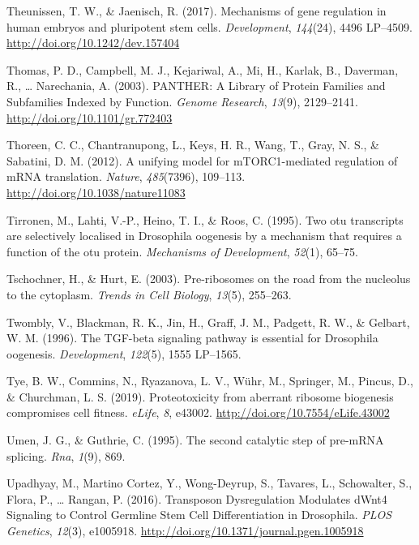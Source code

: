 \documentclass[12pt,oneside]{reedthesis}
\newlength{\cslhangindent}
\newenvironment{cslreferences}%
  {\setlength{\parindent}{0pt}%
  \everypar{\setlength{\hangindent}{\cslhangindent}}\ignorespaces}%
  {\par}
\begin{document}
\begin{cslreferences}
\leavevmode\hypertarget{ref-Theunissen2017b}{}%
Theunissen, T. W., \& Jaenisch, R. (2017). Mechanisms of gene regulation in human embryos and pluripotent stem cells. \emph{Development}, \emph{144}(24), 4496 LP--4509. \url{http://doi.org/10.1242/dev.157404}

\leavevmode\hypertarget{ref-thomasPANTHERLibraryProtein2003}{}%
Thomas, P. D., Campbell, M. J., Kejariwal, A., Mi, H., Karlak, B., Daverman, R., \ldots{} Narechania, A. (2003). PANTHER: A Library of Protein Families and Subfamilies Indexed by Function. \emph{Genome Research}, \emph{13}(9), 2129--2141. \url{http://doi.org/10.1101/gr.772403}

\leavevmode\hypertarget{ref-thoreenUnifyingModelMTORC1mediated2012}{}%
Thoreen, C. C., Chantranupong, L., Keys, H. R., Wang, T., Gray, N. S., \& Sabatini, D. M. (2012). A unifying model for mTORC1-mediated regulation of mRNA translation. \emph{Nature}, \emph{485}(7396), 109--113. \url{http://doi.org/10.1038/nature11083}

\leavevmode\hypertarget{ref-Tirronen1995}{}%
Tirronen, M., Lahti, V.-P., Heino, T. I., \& Roos, C. (1995). Two otu transcripts are selectively localised in Drosophila oogenesis by a mechanism that requires a function of the otu protein. \emph{Mechanisms of Development}, \emph{52}(1), 65--75.

\leavevmode\hypertarget{ref-Tschochner2003a}{}%
Tschochner, H., \& Hurt, E. (2003). Pre-ribosomes on the road from the nucleolus to the cytoplasm. \emph{Trends in Cell Biology}, \emph{13}(5), 255--263.

\leavevmode\hypertarget{ref-Twombly1996d}{}%
Twombly, V., Blackman, R. K., Jin, H., Graff, J. M., Padgett, R. W., \& Gelbart, W. M. (1996). The TGF-beta signaling pathway is essential for Drosophila oogenesis. \emph{Development}, \emph{122}(5), 1555 LP--1565.

\leavevmode\hypertarget{ref-tyeProteotoxicityAberrantRibosome2019}{}%
Tye, B. W., Commins, N., Ryazanova, L. V., Wühr, M., Springer, M., Pincus, D., \& Churchman, L. S. (2019). Proteotoxicity from aberrant ribosome biogenesis compromises cell fitness. \emph{eLife}, \emph{8}, e43002. \url{http://doi.org/10.7554/eLife.43002}

\leavevmode\hypertarget{ref-Umen1995}{}%
Umen, J. G., \& Guthrie, C. (1995). The second catalytic step of pre-mRNA splicing. \emph{Rna}, \emph{1}(9), 869.

\leavevmode\hypertarget{ref-upadhyayTransposonDysregulationModulates2016}{}%
Upadhyay, M., Martino Cortez, Y., Wong-Deyrup, S., Tavares, L., Schowalter, S., Flora, P., \ldots{} Rangan, P. (2016). Transposon Dysregulation Modulates dWnt4 Signaling to Control Germline Stem Cell Differentiation in Drosophila. \emph{PLOS Genetics}, \emph{12}(3), e1005918. \url{http://doi.org/10.1371/journal.pgen.1005918}


\end{cslreferences}
\end{document}
